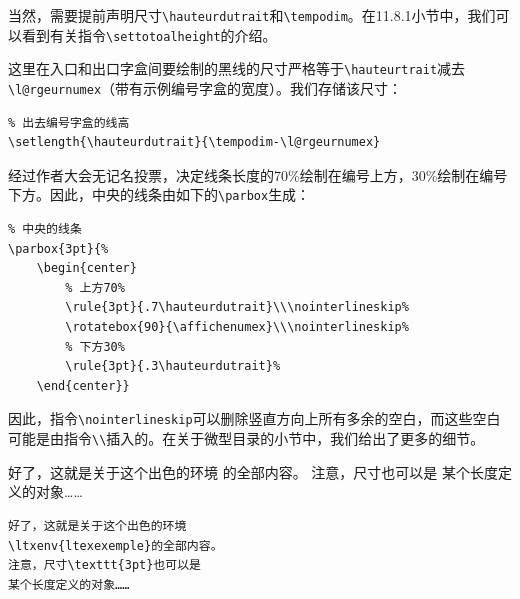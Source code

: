 当然，需要提前声明尺寸\verb|\hauteurdutrait|和\verb|\tempodim|。在11.8.1小节中，我们可以看到有关指令\verb|\settotoalheight|的介绍。

这里在入口和出口字盒间要绘制的黑线的尺寸严格等于\verb|\hauteurtrait|减去\verb|\l@rgeurnumex|（带有示例编号字盒的宽度）。我们存储该尺寸：

\begin{dmd}
\begin{verbatim}
% 出去编号字盒的线高
\setlength{\hauteurdutrait}{\tempodim-\l@rgeurnumex}
\end{verbatim}
\end{dmd}

经过作者大会无记名投票，决定线条长度的70\%绘制在编号上方，30\%绘制在编号下方。因此，中央的线条由如下的\verb|\parbox|生成：

\begin{dmd}
\begin{verbatim}
% 中央的线条
\parbox{3pt}{%
    \begin{center}
        % 上方70% 
        \rule{3pt}{.7\hauteurdutrait}\\\nointerlineskip% 
        \rotatebox{90}{\affichenumex}\\\nointerlineskip% 
        % 下方30% 
        \rule{3pt}{.3\hauteurdutrait}%
    \end{center}}
\end{verbatim}
\end{dmd}

因此，指令\verb|\nointerlineskip|可以删除竖直方向上所有多余的空白，而这些空白可能是由指令\verb|\\|插入的。在关于微型目录的小节中，我们给出了更多的细节。

\begin{codelist}[11.37]{
好了，这就是关于这个出色的环境
的全部内容。
注意，尺寸\dm{3pt}也可以是
某个长度定义的对象……
}\begin{verbatim}
好了，这就是关于这个出色的环境
\ltxenv{ltexexemple}的全部内容。
注意，尺寸\texttt{3pt}也可以是
某个长度定义的对象……
\end{verbatim}
\end{codelist}